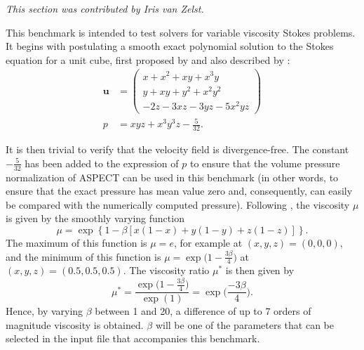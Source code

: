 \documentclass{article}
\newcommand{\aspect}{\textsc{ASPECT}}
\begin{document}
\textit{This section was contributed by Iris van Zelst.}

This benchmark is intended to test solvers for variable viscosity Stokes
problems. It begins with postulating a smooth exact polynomial solution to the Stokes equation for a unit cube, first proposed by \cite{dobo04} and also described by \cite{busa13}:
\begin{align}
  {\mathbf u} &= \left( \begin{array}{c}
      x+x^2+xy+x^3y \\
      y + xy + y^2 + x^2 y^2\\
      -2z - 3xz - 3yz - 5x^2 yz
    \end{array}
  \right)
  \label{eq:burstedde-velocity}
  \\
  p &= xyz + x^3 y^3z - \frac{5}{32}.
  \label{eq:burstedde-pressure}
\end{align}

It is then trivial to verify that the velocity field is divergence-free. The
constant $-\frac{5}{32}$ has been added to the expression of $p$ to ensure
that the volume pressure normalization of \aspect{} can be used in this
benchmark (in other words, to ensure that the exact pressure has mean value
zero and, consequently, can easily be compared with the numerically computed
pressure). Following \cite{busa13}, the viscosity $\mu$ is given by the smoothly varying function 
\begin{equation}
  \mu = \exp\left\{1 - \beta\left[x (1-x) + y(1-y) + z(1-z)\right]\right\}.
  \label{eq:burstedde-mu}
\end{equation}
The maximum of this function is $\mu = e$, for example at $(x,y,z)=(0,0,0)$, and the minimum of this function is $\mu = \exp \Big( 1-\frac{3\beta}{4}\Big)$ at $(x,y,z) = (0.5,0.5,0.5)$. The viscosity ratio $\mu^*$ is then given by 
\begin{equation}
  \mu^* = \frac{\exp\Big(1-\frac{3\beta}{4}\Big)}{\exp(1)} = \exp\Big(\frac{-3\beta}{4}\Big).
\end{equation}
Hence, by varying $\beta$ between 1 and 20, a difference of up to 7 orders of
magnitude viscosity is obtained. $\beta$ will be one of the parameters that
can be selected in the input file that accompanies this benchmark.
\end{document}
